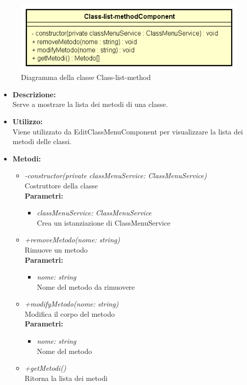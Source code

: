 \begin{figure}[h!]
	\centering
	\includegraphics[scale=0.8]{res/sections/SpecificaFrontEnd/Components/Disegnetti/class-list-method.png}
	\caption{Diagramma della classe Class-list-method}
\end{figure}

\begin{itemize}
	\item \textbf{Descrizione:}\\
	Serve a mostrare la lista dei metodi di una classe.
	\item \textbf{Utilizzo:}\\
	Viene utilizzato da EditClassMenuComponent per visualizzare la lista dei metodi delle classi.
	\item \textbf{Metodi:}
		\begin{itemize}
			\item \emph{-constructor(private classMenuService: ClassMenuService)}\\
    		Costruttore della classe\\
    		\textbf{Parametri:}
    		\begin{itemize}
    			\item \emph{classMenuService: ClassMenuService}\\
    			Crea un istanziazione di ClassMenuService
    		\end{itemize}
    		\item \emph{+removeMetodo(nome: string)}\\
    		Rimuove un metodo\\
    		\textbf{Parametri:}
    		\begin{itemize}
    			\item \emph{nome: string}\\
    			Nome del metodo da rimuovere
    		\end{itemize}
    		\item \emph{+modifyMetodo(nome: string)}\\
    		Modifica il corpo del metodo\\
    		\textbf{Parametri:}
    		\begin{itemize}
    			\item \emph{nome: string}\\
    			Nome del metodo
    		\end{itemize}
    		\item \emph{+getMetodi()}\\
    		Ritorna la lista dei metodi
		\end{itemize}
\end{itemize}